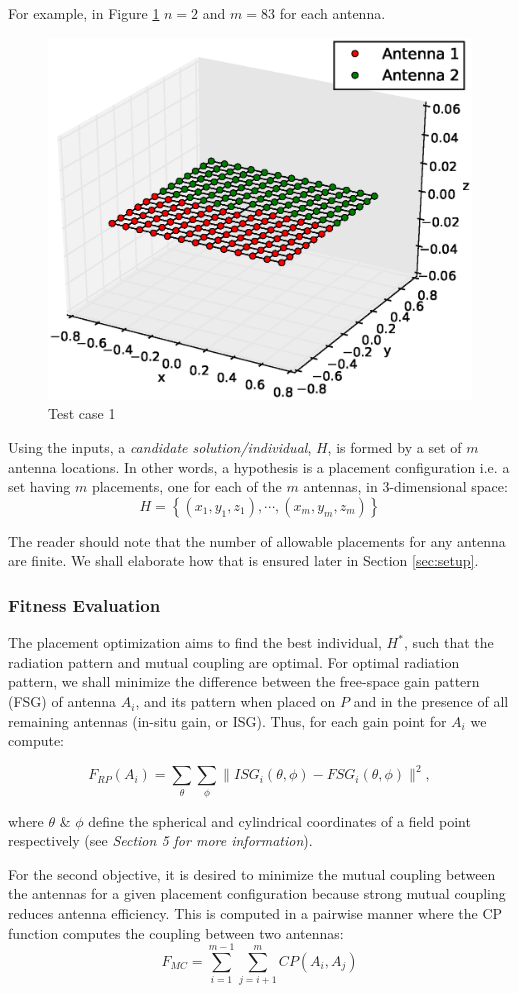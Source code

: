 \documentclass{sig-alternate}
\begin{document}
For example, in Figure \ref{fig:tc1} $n=2$ and $m=83$ for each antenna.
\begin{figure}
    \begin{center}
        \includegraphics[width=.41\textwidth]{FIG/tc_1_figure}
\end{center}
\caption{Test case 1}
\label{fig:tc1}
\end{figure}

Using the inputs, a \textit{candidate solution/individual}, $H$, is formed by a set of $m$ antenna locations. In other words, a hypothesis is a placement configuration i.e. a set having $m$ placements, one for each of the $m$ antennas, in 3-dimensional space:
\[
    H  = \left\{(x_1, y_1, z_1), \cdots, (x_m, y_m, z_m)\right\}
\]

The reader should note that the number of allowable placements for any antenna are finite. We shall elaborate how that is ensured later in Section \ref{sec:setup}.

\subsubsection{Fitness Evaluation}
The placement optimization aims to find the best individual, $H^*$, such that the radiation pattern and mutual coupling are optimal. For optimal radiation pattern, we shall minimize the difference between the free-space gain pattern (FSG) of antenna $A_i$, and its pattern when placed on $P$ and in the presence of all remaining antennas (in-situ gain, or ISG).  Thus, for each gain point for $A_i$ we compute:

\begin{equation} \label{eq:rp}
  F_{RP}(A_i) = \sum_{\theta}\sum_{\phi} 
           \| ISG_i(\theta,\phi) - FSG_i(\theta,\phi) \| ^2,
\end{equation}

where $\theta$ \& $\phi$ define the spherical and cylindrical coordinates of a field point respectively (see \textit{Section 5 for more information}).

For the second objective, it is desired to minimize the mutual coupling between the antennas for a given placement configuration because strong mutual coupling reduces antenna efficiency. This is computed in a pairwise manner where the CP function computes the coupling between two antennas:
\begin{equation}
  F_{MC} = \sum_{i=1}^{m-1}\sum_{j=i+1}^{m} CP(A_i, A_j)
\end{equation}
\end{document}

